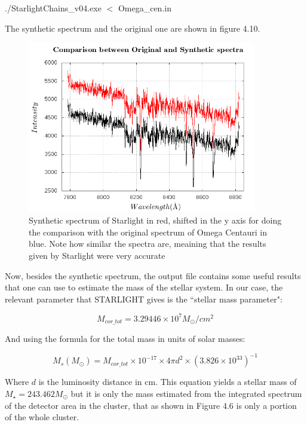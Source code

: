 \begin{center}
./StarlightChains\_v04.exe $<$ Omega\_cen.in
\end{center}

The synthetic spectrum and the original one are shown in figure 4.10.

\begin{figure}[H]
\centering
\includegraphics[width=10cm]{images/comparison.png}
\caption[Synthetic spectrum of STARLIGHT]{Synthetic spectrum of Starlight in red, shifted in the y axis for doing the comparison with the original spectrum of Omega Centauri in blue. Note how similar the spectra are, meaining that the results given by Starlight were very accurate}
\end{figure}
 
Now, besides the synthetic spectrum, the output file contains some useful results that one can use to estimate the mass of the stellar system. In our case, the relevant parameter that STARLIGHT gives is the ``stellar mass parameter":

\begin{equation}
M_{cor\_tot} = 3.29446 \times 10^{7} M_{\odot}/cm^{2}
\end{equation}

And using the formula for the total mass in units of solar masses:

\begin{equation}
M_{s}(M_{\odot})=M_{cor\_tot}\times10^{-17}\times4\pi d^{2}\times\left(3.826\times10^{33}\right)^{-1}
\end{equation}

Where $d$ is the luminosity distance in cm. This equation yields a stellar mass of $M_{\star}=243.462M_{\odot}$ but it is only the mass estimated from the integrated spectrum of the detector area in the cluster, that as shown in Figure 4.6 is only a portion of the whole cluster.

